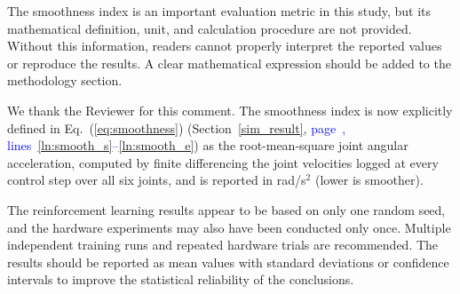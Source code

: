 \documentclass[11pt]{elsarticle}
\newcommand{\mlines}[2]{\textcolor{blue}{page~\pageref{#1}, lines~\ref{#1}--\ref{#2}}}
\begin{document}
\begin{reviewerbox}[Comment R1.6]
The smoothness index is an important evaluation metric in this study, but its mathematical definition, unit, and calculation procedure are not provided. Without this information, readers cannot properly interpret the reported values or reproduce the results. A clear mathematical expression should be added to the methodology section.
\end{reviewerbox}

\begin{responsebox}
We thank the Reviewer for this comment. The smoothness index is now explicitly defined in Eq.~(\ref{eq:smoothness}) (Section~\ref{sim_result}, \mlines{ln:smooth_s}{ln:smooth_e}) as the root-mean-square joint angular acceleration, computed by finite differencing the joint velocities logged at every control step over all six joints, and is reported in rad/s$^{2}$ (lower is smoother).
\end{responsebox}

\begin{reviewerbox}[Comment R1.7]
The reinforcement learning results appear to be based on only one random seed, and the hardware experiments may also have been conducted only once. Multiple independent training runs and repeated hardware trials are recommended. The results should be reported as mean values with standard deviations or confidence intervals to improve the statistical reliability of the conclusions.
\end{reviewerbox}
\end{document}
